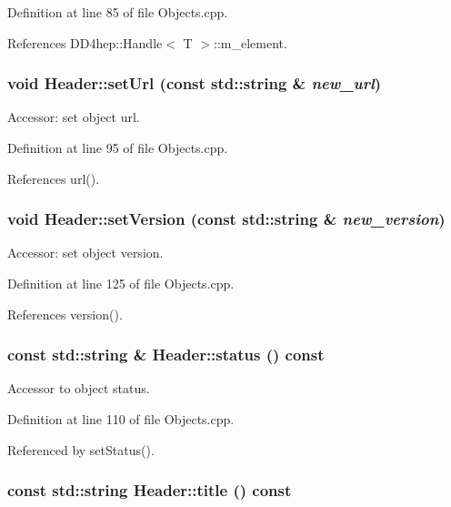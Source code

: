 Definition at line 85 of file Objects.cpp.

References DD4hep::Handle$<$ T $>$::m\_\-element.\hypertarget{class_d_d4hep_1_1_geometry_1_1_header_ae7931709b0b3f36f483c4849d5022b38}{
\subsubsection[{setUrl}]{\setlength{\rightskip}{0pt plus 5cm}void Header::setUrl (const std::string \& {\em new\_\-url})}}
\label{class_d_d4hep_1_1_geometry_1_1_header_ae7931709b0b3f36f483c4849d5022b38}


Accessor: set object url. 

Definition at line 95 of file Objects.cpp.

References url().\hypertarget{class_d_d4hep_1_1_geometry_1_1_header_a33ab2e124d5c8f3f2d3f05a50be4bdad}{
\subsubsection[{setVersion}]{\setlength{\rightskip}{0pt plus 5cm}void Header::setVersion (const std::string \& {\em new\_\-version})}}
\label{class_d_d4hep_1_1_geometry_1_1_header_a33ab2e124d5c8f3f2d3f05a50be4bdad}


Accessor: set object version. 

Definition at line 125 of file Objects.cpp.

References version().\hypertarget{class_d_d4hep_1_1_geometry_1_1_header_a593bf368f3e224f0488fb39f4ca843b6}{
\subsubsection[{status}]{\setlength{\rightskip}{0pt plus 5cm}const std::string \& Header::status () const}}
\label{class_d_d4hep_1_1_geometry_1_1_header_a593bf368f3e224f0488fb39f4ca843b6}


Accessor to object status. 

Definition at line 110 of file Objects.cpp.

Referenced by setStatus().\hypertarget{class_d_d4hep_1_1_geometry_1_1_header_a4b1cd787d7ed06dd85a7627b15ea1a59}{
\subsubsection[{title}]{\setlength{\rightskip}{0pt plus 5cm}const std::string Header::title () const}}
\label{class_d_d4hep_1_1_geometry_1_1_header_a4b1cd787d7ed06dd85a7627b15ea1a59}


